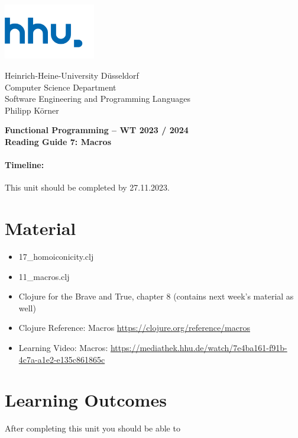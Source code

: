 \documentclass[11pt,a4paper]{article}
\begin{document}
\begin{minipage}[b]{\textwidth}
	\parbox[t]{5cm}{%
		\includegraphics[width=4cm]{unilogo}
		\hfill
	}
	\parbox[b]{11cm}{%
		Heinrich-Heine-University D\"usseldorf\\
		Computer Science Department\\
		Software Engineering and Programming Languages\\
		Philipp K\"orner
	}
\end{minipage}
\begin{center}
	\bf
	Functional Programming -- WT 2023 / 2024\\
	Reading Guide 7: Macros
\end{center}

\pagestyle{empty}

\paragraph{Timeline:} This unit should be completed by 27.11.2023.

\section{Material} 

\begin{itemize}
    \item 17\_homoiconicity.clj
    \item 11\_macros.clj
    \item Clojure for the Brave and True, chapter 8 (contains next week's material as well)
	\item Clojure Reference: Macros \url{https://clojure.org/reference/macros}
    \item Learning Video: Macros: \url{https://mediathek.hhu.de/watch/7e4ba161-f91b-4c7a-a1e2-e135c861865c}
\end{itemize}


\section{Learning Outcomes}

After completing this unit you should be able to
\end{document}
